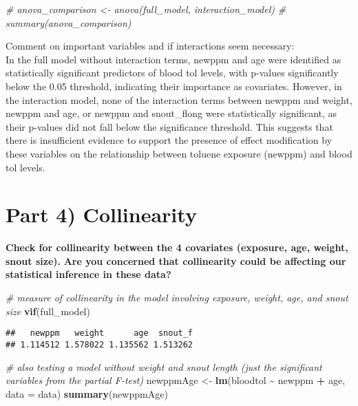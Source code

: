 \documentclass[
]{article}
\newenvironment{Shaded}{\begin{snugshade}}{\end{snugshade}}
\newcommand{\AttributeTok}[1]{\textcolor[rgb]{0.13,0.29,0.53}{#1}}
\newcommand{\CommentTok}[1]{\textcolor[rgb]{0.56,0.35,0.01}{\textit{#1}}}
\newcommand{\FunctionTok}[1]{\textcolor[rgb]{0.13,0.29,0.53}{\textbf{#1}}}
\newcommand{\NormalTok}[1]{#1}
\newcommand{\OtherTok}[1]{\textcolor[rgb]{0.56,0.35,0.01}{#1}}
\newcommand{\SpecialCharTok}[1]{\textcolor[rgb]{0.81,0.36,0.00}{\textbf{#1}}}
\begin{document}
\begin{Shaded}
\begin{Highlighting}[]
\CommentTok{\# anova\_comparison \textless{}{-} anova(full\_model, interaction\_model)}
\CommentTok{\# summary(anova\_comparison)}
\end{Highlighting}
\end{Shaded}

Comment on important variables and if interactions seem necessary:\\
In the full model without interaction terms, newppm and age were
identified as statistically significant predictors of blood tol levels,
with p-values significantly below the 0.05 threshold, indicating their
importance as covariates. However, in the interaction model, none of the
interaction terms between newppm and weight, newppm and age, or newppm
and snout\_flong were statistically significant, as their p-values did
not fall below the significance threshold. This suggests that there is
insufficient evidence to support the presence of effect modification by
these variables on the relationship between toluene exposure (newppm)
and blood tol levels.

\section{Part 4) Collinearity}\label{part-4-collinearity}

\textbf{Check for collinearity between the 4 covariates (exposure, age,
weight, snout size).} \textbf{Are you concerned that collinearity could
be affecting our statistical inference in these data?}

\begin{Shaded}
\begin{Highlighting}[]
\CommentTok{\# measure of collinearity in the model involving exposure, weight, age, and snout size}
\FunctionTok{vif}\NormalTok{(full\_model)}
\end{Highlighting}
\end{Shaded}

\begin{verbatim}
##   newppm   weight      age  snout_f 
## 1.114512 1.578022 1.135562 1.513262
\end{verbatim}

\begin{Shaded}
\begin{Highlighting}[]
\CommentTok{\# also testing a model without weight and snout length (just the significant variables from the partial F{-}test)}
\NormalTok{newppmAge }\OtherTok{\textless{}{-}} \FunctionTok{lm}\NormalTok{(bloodtol }\SpecialCharTok{\textasciitilde{}}\NormalTok{ newppm }\SpecialCharTok{+}\NormalTok{ age, }\AttributeTok{data =}\NormalTok{ data)}
\FunctionTok{summary}\NormalTok{(newppmAge)}
\end{Highlighting}
\end{Shaded}
\end{document}
